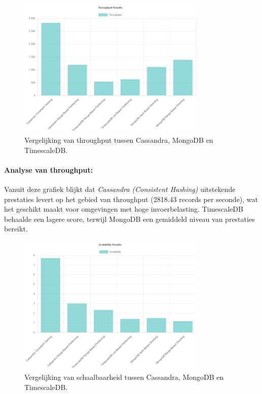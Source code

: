 \begin{figure}[H]
    \centering
    \includegraphics[width=0.8\textwidth]{Throughput.png}
    \caption{Vergelijking van throughput tussen Cassandra, MongoDB en TimescaleDB.}
    \label{fig:throughput-comparison}
\end{figure}

\paragraph{Analyse van throughput:}
Vanuit deze grafiek blijkt dat \textit{Cassandra (Consistent Hashing)} uitstekende prestaties levert op het gebied van throughput (2818.43 records per seconde), wat het geschikt maakt voor omgevingen met hoge invoerbelasting. TimescaleDB behaalde een lagere score, terwijl MongoDB een gemiddeld niveau van prestaties bereikt.

\begin{figure}[H]
    \centering
    \includegraphics[width=0.8\textwidth]{Scalability.png}
    \caption{Vergelijking van schaalbaarheid tussen Cassandra, MongoDB en TimescaleDB.}
    \label{fig:scalability-comparison}
\end{figure}


